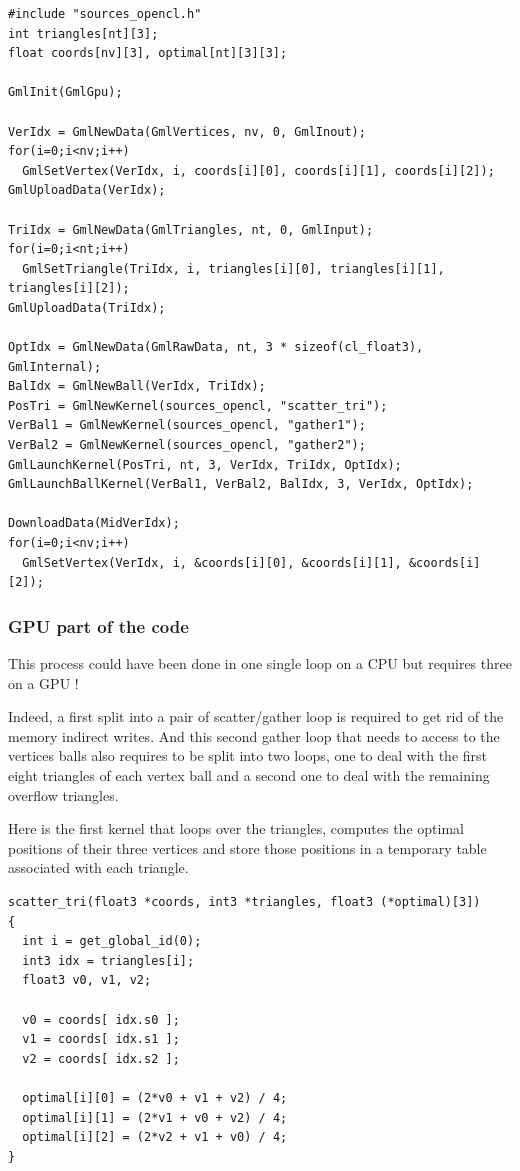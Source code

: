 \documentclass[a4paper,12pt]{article}
\begin{document}
\begin{tt}
\begin{verbatim}
#include "sources_opencl.h"
int triangles[nt][3];
float coords[nv][3], optimal[nt][3][3];

GmlInit(GmlGpu);

VerIdx = GmlNewData(GmlVertices, nv, 0, GmlInout);
for(i=0;i<nv;i++)
  GmlSetVertex(VerIdx, i, coords[i][0], coords[i][1], coords[i][2]);
GmlUploadData(VerIdx);

TriIdx = GmlNewData(GmlTriangles, nt, 0, GmlInput);
for(i=0;i<nt;i++)
  GmlSetTriangle(TriIdx, i, triangles[i][0], triangles[i][1], triangles[i][2]);
GmlUploadData(TriIdx);

OptIdx = GmlNewData(GmlRawData, nt, 3 * sizeof(cl_float3), GmlInternal);
BalIdx = GmlNewBall(VerIdx, TriIdx);
PosTri = GmlNewKernel(sources_opencl, "scatter_tri");
VerBal1 = GmlNewKernel(sources_opencl, "gather1");
VerBal2 = GmlNewKernel(sources_opencl, "gather2");
GmlLaunchKernel(PosTri, nt, 3, VerIdx, TriIdx, OptIdx);
GmlLaunchBallKernel(VerBal1, VerBal2, BalIdx, 3, VerIdx, OptIdx);

DownloadData(MidVerIdx);
for(i=0;i<nv;i++)
  GmlSetVertex(VerIdx, i, &coords[i][0], &coords[i][1], &coords[i][2]);
\end{verbatim}
\end{tt}
\normalfont


\subsubsection{GPU part of the code}
This process could have been done in one single loop on a CPU but requires three on a GPU !

Indeed, a first split into a pair of scatter/gather loop is required to get rid of the memory indirect writes. And this second gather loop that needs to access to the vertices balls also requires to be split into two loops, one to deal with the first eight triangles of each vertex ball and a second one to deal with the remaining overflow triangles.

Here is the first kernel that loops over the triangles, computes the optimal positions of their three vertices and store those positions in a temporary table associated with each triangle.


\begin{tt}
\begin{verbatim}
scatter_tri(float3 *coords, int3 *triangles, float3 (*optimal)[3])
{
  int i = get_global_id(0);
  int3 idx = triangles[i];
  float3 v0, v1, v2;

  v0 = coords[ idx.s0 ];
  v1 = coords[ idx.s1 ];
  v2 = coords[ idx.s2 ];

  optimal[i][0] = (2*v0 + v1 + v2) / 4;
  optimal[i][1] = (2*v1 + v0 + v2) / 4;
  optimal[i][2] = (2*v2 + v1 + v0) / 4;
}
\end{verbatim}
\end{tt}
\normalfont
\end{document}
